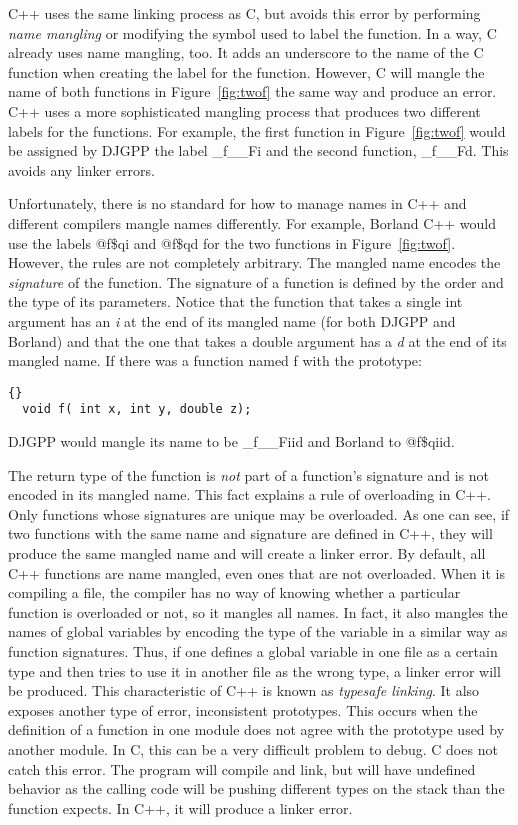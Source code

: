 C++ uses the same linking process as C, but avoids this error by
performing \emph{name mangling} or modifying the symbol used to label
the function. In a way, C already uses name mangling, too. It adds an
underscore to the name of the C function when creating the label for
the function. However, C will mangle the name of both functions in
Figure~\ref{fig:twof} the same way and produce an error. C++ uses a
more sophisticated mangling process that produces two different labels
for the functions. For example, the first function in
Figure~\ref{fig:twof} would be assigned by DJGPP the label {\code
\_f\_\_Fi} and the second function, {\code \_f\_\_Fd}. This avoids any
linker errors.

Unfortunately, there is no standard for how to manage names in C++ and
different compilers mangle names differently. For example, Borland C++ would
use the labels {\code @f\$qi} and {\code @f\$qd} for the two functions
in Figure~\ref{fig:twof}. However, the rules are not completely arbitrary.
The mangled name encodes the \emph{signature} of the function. The signature
of a function is defined by the order and the type of its parameters. 
Notice that the function that takes a single {\code int} argument has an
\emph{i} at the end of its mangled name (for both DJGPP and Borland) and that
the one that takes a {\code double} argument has a \emph{d} at the end of
its mangled name. If there was a function named {\code f} with the
prototype:
\begin{lstlisting}[stepnumber=0]{}
  void f( int x, int y, double z);
\end{lstlisting}
\noindent DJGPP would mangle its name to be {\code \_f\_\_Fiid} and Borland to
{\code @f\$qiid}.

The return type of the function is \emph{not} part of a function's
signature and is not encoded in its mangled name. This fact explains a
rule of overloading in C++. Only functions whose signatures are unique
may be overloaded. As one can see, if two functions with the same name
and signature are defined in C++, they will produce the same mangled
name and will create a linker error. By default, all C++ functions are
name mangled, even ones that are not overloaded. When it is compiling
a file, the compiler has no way of knowing whether a particular
function is overloaded or not, so it mangles all names. In fact, it
also mangles the names of global variables by encoding the type of the
variable in a similar way as function signatures. Thus, if one defines
a global variable in one file as a certain type and then tries to use
it in another file as the wrong type, a linker error will be
produced. This characteristic of C++ is known as \emph{typesafe
linking}. It also exposes another type of
error, inconsistent prototypes. This occurs when the definition of a
function in one module does not agree with the prototype used by
another module. In C, this can be a very difficult problem to debug. C
does not catch this error. The program will compile and link, but will
have undefined behavior as the calling code will be pushing different
types on the stack than the function expects. In C++, it will produce
a linker error.

